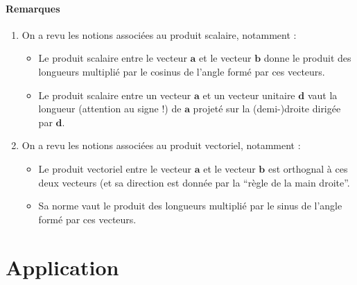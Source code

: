\documentclass[a4paper,10pt]{tp_um}
\begin{document}
\paragraph{Remarques}
\begin{enumerate}
 \item On a revu les notions associées au produit scalaire, notamment :
\begin{itemize}
 \item Le produit scalaire entre le vecteur $\mathbf{a}$ et le vecteur $\mathbf{b}$ donne le produit des longueurs multiplié par le cosinus de
l’angle formé par ces vecteurs.
\item Le produit scalaire entre un vecteur $\mathbf{a}$ et un vecteur unitaire $\mathbf{d}$ vaut la longueur (attention au signe !) de $\mathbf{a}$ projeté
sur la (demi-)droite dirigée par $\mathbf{d}$.
\end{itemize}

\item On a revu les notions associées au produit vectoriel, notamment :
\begin{itemize}
 \item Le produit vectoriel entre le vecteur $\mathbf{a}$ et le vecteur $\mathbf{b}$ est orthognal à ces deux vecteurs (et sa direction est donnée
par la ``règle de la main droite''.
\item Sa norme vaut le produit des longueurs multiplié par le sinus de l’angle formé par ces vecteurs.
\end{itemize}
\end{enumerate}

\section{Application}
\end{document}
